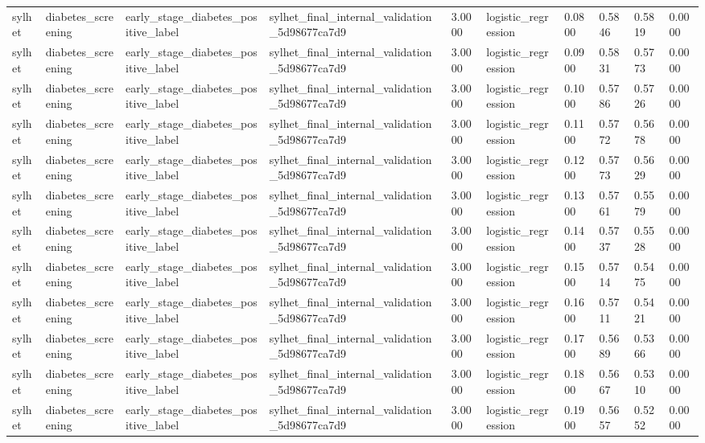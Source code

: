 \begin{tabular}{llllllllll}
sylhet & diabetes\_screening & early\_stage\_diabetes\_positive\_label & sylhet\_final\_internal\_validation\_5d98677ca7d9 & 3.0000 & logistic\_regression & 0.0800 & 0.5846 & 0.5819 & 0.0000 \\
sylhet & diabetes\_screening & early\_stage\_diabetes\_positive\_label & sylhet\_final\_internal\_validation\_5d98677ca7d9 & 3.0000 & logistic\_regression & 0.0900 & 0.5831 & 0.5773 & 0.0000 \\
sylhet & diabetes\_screening & early\_stage\_diabetes\_positive\_label & sylhet\_final\_internal\_validation\_5d98677ca7d9 & 3.0000 & logistic\_regression & 0.1000 & 0.5786 & 0.5726 & 0.0000 \\
sylhet & diabetes\_screening & early\_stage\_diabetes\_positive\_label & sylhet\_final\_internal\_validation\_5d98677ca7d9 & 3.0000 & logistic\_regression & 0.1100 & 0.5772 & 0.5678 & 0.0000 \\
sylhet & diabetes\_screening & early\_stage\_diabetes\_positive\_label & sylhet\_final\_internal\_validation\_5d98677ca7d9 & 3.0000 & logistic\_regression & 0.1200 & 0.5773 & 0.5629 & 0.0000 \\
sylhet & diabetes\_screening & early\_stage\_diabetes\_positive\_label & sylhet\_final\_internal\_validation\_5d98677ca7d9 & 3.0000 & logistic\_regression & 0.1300 & 0.5761 & 0.5579 & 0.0000 \\
sylhet & diabetes\_screening & early\_stage\_diabetes\_positive\_label & sylhet\_final\_internal\_validation\_5d98677ca7d9 & 3.0000 & logistic\_regression & 0.1400 & 0.5737 & 0.5528 & 0.0000 \\
sylhet & diabetes\_screening & early\_stage\_diabetes\_positive\_label & sylhet\_final\_internal\_validation\_5d98677ca7d9 & 3.0000 & logistic\_regression & 0.1500 & 0.5714 & 0.5475 & 0.0000 \\
sylhet & diabetes\_screening & early\_stage\_diabetes\_positive\_label & sylhet\_final\_internal\_validation\_5d98677ca7d9 & 3.0000 & logistic\_regression & 0.1600 & 0.5711 & 0.5421 & 0.0000 \\
sylhet & diabetes\_screening & early\_stage\_diabetes\_positive\_label & sylhet\_final\_internal\_validation\_5d98677ca7d9 & 3.0000 & logistic\_regression & 0.1700 & 0.5689 & 0.5366 & 0.0000 \\
sylhet & diabetes\_screening & early\_stage\_diabetes\_positive\_label & sylhet\_final\_internal\_validation\_5d98677ca7d9 & 3.0000 & logistic\_regression & 0.1800 & 0.5667 & 0.5310 & 0.0000 \\
sylhet & diabetes\_screening & early\_stage\_diabetes\_positive\_label & sylhet\_final\_internal\_validation\_5d98677ca7d9 & 3.0000 & logistic\_regression & 0.1900 & 0.5657 & 0.5252 & 0.0000 \\

\end{tabular}
